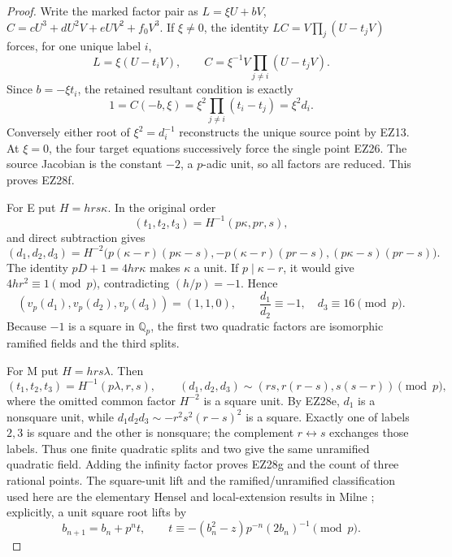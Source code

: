 \documentclass[11pt]{article}
\theoremstyle{definition}\newtheorem{definition}[theorem]{Definition}
\theoremstyle{remark}\newtheorem{remark}[theorem]{Remark}
\newcommand{\Q}{\mathbb Q}
\begin{document}
\begin{proof}
Write the marked factor pair as
\(L=\xi U+bV\), \(C=cU^3+dU^2V+eUV^2+f_0V^3\).  If \(\xi\ne0\), the identity
\(LC=V\prod_j(U-t_jV)\) forces, for one unique label \(i\),
\[
 L=\xi(U-t_iV),\qquad
 C=\xi^{-1}V\prod_{j\ne i}(U-t_jV).
\]
Since \(b=-\xi t_i\), the retained resultant condition is exactly
\[
 1=C(-b,\xi)=\xi^2\prod_{j\ne i}(t_i-t_j)=\xi^2d_i.
\]
Conversely either root of \(\xi^2=d_i^{-1}\) reconstructs the unique source
point by EZ13.  At \(\xi=0\), the four target equations successively force the
single point EZ26.  The source Jacobian is the constant \(-2\), a \(p\)-adic
unit, so all factors are reduced.  This proves EZ28f.

For E put \(H=hrs\kappa\).  In the original order
\begin{equation}
 (t_1,t_2,t_3)=H^{-1}(p\kappa,pr,s),                    \tag{EZ28h}
\end{equation}
and direct subtraction gives
\begin{equation}
 (d_1,d_2,d_3)=H^{-2}\bigl(
 p(\kappa-r)(p\kappa-s),
 -p(\kappa-r)(pr-s),
 (p\kappa-s)(pr-s)\bigr).                             \tag{EZ28i}
\end{equation}
The identity \(pD+1=4hr\kappa\) makes \(\kappa\) a unit.  If
\(p\mid\kappa-r\), it would give \(4hr^2\equiv1\pmod p\), contradicting
\((h/p)=-1\).  Hence
\begin{equation}
 (v_p(d_1),v_p(d_2),v_p(d_3))=(1,1,0),\qquad
 \frac{d_1}{d_2}\equiv-1,\quad d_3\equiv16\pmod p.    \tag{EZ28j}
\end{equation}
Because \(-1\) is a square in \(\Q_p\), the first two quadratic factors are
isomorphic ramified fields and the third splits.

For M put \(H=hrs\lambda\).  Then
\begin{equation}
 (t_1,t_2,t_3)=H^{-1}(p\lambda,r,s),\qquad
 (d_1,d_2,d_3)\sim(rs,r(r-s),s(s-r))\pmod p,           \tag{EZ28k}
\end{equation}
where the omitted common factor \(H^{-2}\) is a square unit.  By EZ28e,
\(d_1\) is a nonsquare unit, while
\(d_1d_2d_3\sim-r^2s^2(r-s)^2\) is a square.  Exactly one of labels \(2,3\)
is square and the other is nonsquare; the complement \(r\leftrightarrow s\)
exchanges those labels.  Thus one finite quadratic splits and two give the
same unramified quadratic field.  Adding the infinity factor proves EZ28g and
the count of three rational points.  The square-unit lift and the
ramified/unramified classification used here are the elementary Hensel and
local-extension results in Milne \cite[Chapter 7]{Milne}; explicitly, a unit
square root lifts by
\[
 b_{n+1}=b_n+p^nt,\qquad
 t\equiv-(b_n^2-z)p^{-n}(2b_n)^{-1}\pmod p.
\]
\end{proof}
\end{document}
